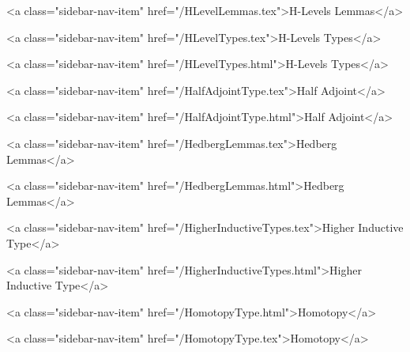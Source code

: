       
        
          <a class="sidebar-nav-item" href="/HLevelLemmas.tex">H-Levels Lemmas</a>
        
      
    
      
        
          <a class="sidebar-nav-item" href="/HLevelTypes.tex">H-Levels Types</a>
        
      
    
      
        
          <a class="sidebar-nav-item" href="/HLevelTypes.html">H-Levels Types</a>
        
      
    
      
        
          <a class="sidebar-nav-item" href="/HalfAdjointType.tex">Half Adjoint</a>
        
      
    
      
        
          <a class="sidebar-nav-item" href="/HalfAdjointType.html">Half Adjoint</a>
        
      
    
      
        
          <a class="sidebar-nav-item" href="/HedbergLemmas.tex">Hedberg Lemmas</a>
        
      
    
      
        
          <a class="sidebar-nav-item" href="/HedbergLemmas.html">Hedberg Lemmas</a>
        
      
    
      
        
          <a class="sidebar-nav-item" href="/HigherInductiveTypes.tex">Higher Inductive Type</a>
        
      
    
      
        
          <a class="sidebar-nav-item" href="/HigherInductiveTypes.html">Higher Inductive Type</a>
        
      
    
      
        
          <a class="sidebar-nav-item" href="/HomotopyType.html">Homotopy</a>
        
      
    
      
        
          <a class="sidebar-nav-item" href="/HomotopyType.tex">Homotopy</a>
        

